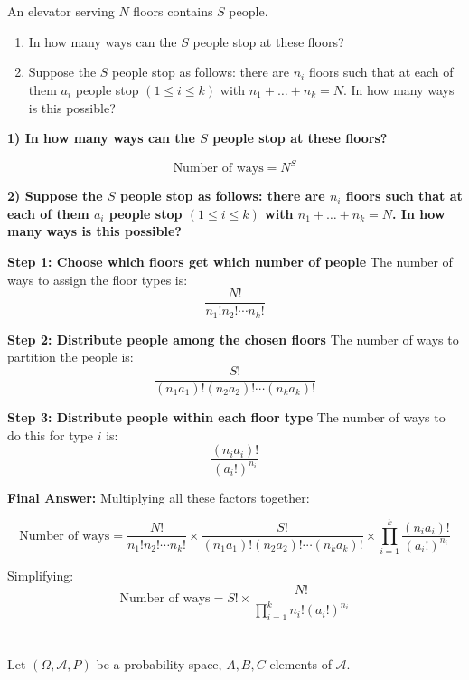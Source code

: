 \documentclass[12pt]{article}
\begin{document}
\section{}
An elevator serving $N$ floors contains $S$ people.

\begin{enumerate}
    \item In how many ways can the $S$ people stop at these floors?
    \item Suppose the $S$ people stop as follows: there are $n_i$ floors such that at each of them $a_i$ people stop $(1 \leq i \leq k)$ with $n_1 + \ldots + n_k = N$. In how many ways is this possible?
\end{enumerate}

\begin{correctionbox}
\textbf{1) In how many ways can the $S$ people stop at these floors?}

\[
\text{Number of ways} = N^S
\]

\textbf{2) Suppose the $S$ people stop as follows: there are $n_i$ floors such that at each of them $a_i$ people stop $(1 \leq i \leq k)$ with $n_1 + \ldots + n_k = N$. In how many ways is this possible?}

\textbf{Step 1: Choose which floors get which number of people}
The number of ways to assign the floor types is:
\[
\frac{N!}{n_1! n_2! \cdots n_k!}
\]

\textbf{Step 2: Distribute people among the chosen floors}
The number of ways to partition the people is:
\[
\frac{S!}{(n_1a_1)! (n_2a_2)! \cdots (n_ka_k)!}
\]

\textbf{Step 3: Distribute people within each floor type}
The number of ways to do this for type $i$ is:
\[
\frac{(n_ia_i)!}{(a_i!)^{n_i}}
\]

\textbf{Final Answer:}
Multiplying all these factors together:

\[
\text{Number of ways} = \frac{N!}{n_1! n_2! \cdots n_k!} \times \frac{S!}{(n_1a_1)! (n_2a_2)! \cdots (n_ka_k)!} \times \prod_{i=1}^k \frac{(n_ia_i)!}{(a_i!)^{n_i}}
\]

Simplifying:
\[
\text{Number of ways} = S! \times \frac{N!}{\prod_{i=1}^k n_i! (a_i!)^{n_i}}
\]

\end{correctionbox}


\section{}
Let $(\Omega, \mathcal{A}, P)$ be a probability space, $A, B, C$ elements of $\mathcal{A}$.
\end{document}
